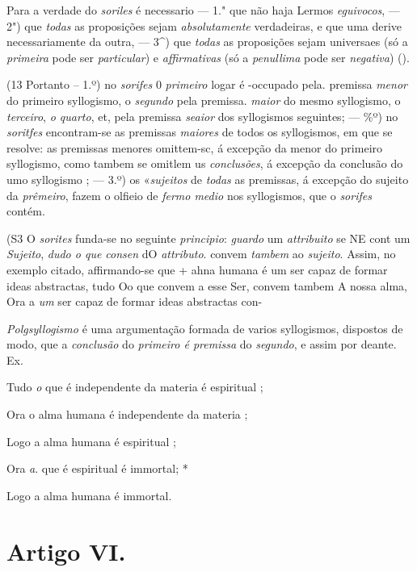 Para a verdade do \emph{soriles} é necessario --- 1." que não haja Lermos \emph{eguivocos}, --- 2") que \emph{todas} as proposições sejam \emph{absolutamente} verdadeiras, e que uma derive necessariamente da outra, --- 3\textasciicircum{}) que \emph{todas} as proposições sejam universaes (só a \emph{primeira} pode ser \emph{particular}) e \emph{affirmativas} (só a \emph{penullima} pode ser \emph{negativa}) (). \textbar{}

(13 Portanto -- 1.º) no \emph{sorifes} 0 \emph{primeiro} logar é -occupado pela. premissa \emph{menor} do primeiro syllogismo, o \emph{segundo} pela premissa. \emph{maior} do mesmo syllogismo, o \emph{terceiro}, \emph{o quarto}, et, pela premissa \emph{seaior} dos syllogismos seguintes; --- \%º) no \emph{soritfes} encontram-se as premissas \emph{maiores} de todos os syllogismos, em que se resolve: as premissas menores omittem-sc, á excepção da menor do primeiro syllogismo, como tambem se omitlem us \emph{conclusões}, á excepção da conclusão do umo syllogismo ; --- 3.º) os «\emph{sujeitos} de \emph{todas} as premissas, á excepção do sujeito da \emph{prêmeiro}, fazem o olfieio de \emph{fermo medio} nos syllogismos, que o \emph{sorifes} contém.

(S3 O \emph{sorites} funda-se no seguinte \emph{principio}: \emph{guardo} um \emph{attribuito} se NE cont um \emph{Sujeito}, \emph{dudo o que consen} dO \emph{attributo}. convem \emph{tambem} ao \emph{sujeito}. Assim, no exemplo citado, affirmando-se que + ahna humana é um ser capaz de formar ideas abstractas, tudo Oo que convem a esse Ser, convem tambem A nossa alma, Ora a \emph{um} ser capaz de formar ideas abstractas con-


  
\emph{Polgsyllogismo} é uma argumentação formada de varios syllogismos, dispostos de modo, que a \emph{conclusão} do \emph{primeiro é premissa} do \emph{segundo}, e assim por deante. Ex.

Tudo \emph{o} que é independente da materia é espiritual ;

Ora o alma humana é independente da materia ;

Logo a alma humana é espiritual ;

Ora \emph{a}. que é espiritual é immortal; *

Logo a alma humana é immortal.


\section*{Artigo VI.}


